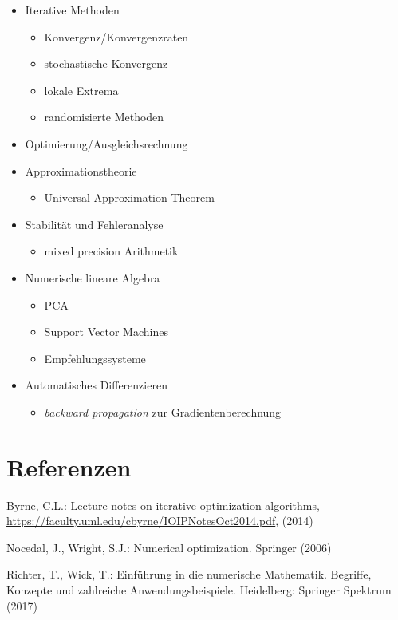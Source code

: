 \documentclass[
]{book}
\providecommand{\tightlist}{%
  \setlength{\itemsep}{0pt}\setlength{\parskip}{0pt}}
\newenvironment{cslreferences}%
  {}%
  {\par}
\theoremstyle{definition}
\theoremstyle{definition}
\theoremstyle{definition}
\theoremstyle{definition}
\theoremstyle{remark}
\begin{document}
\begin{itemize}
\item
  Iterative Methoden

  \begin{itemize}
  \tightlist
  \item
    Konvergenz/Konvergenzraten
  \item
    stochastische Konvergenz
  \item
    lokale Extrema
  \item
    randomisierte Methoden
  \end{itemize}
\item
  Optimierung/Ausgleichsrechnung
\item
  Approximationstheorie

  \begin{itemize}
  \tightlist
  \item
    Universal Approximation Theorem
  \end{itemize}
\item
  Stabilität und Fehleranalyse

  \begin{itemize}
  \tightlist
  \item
    mixed precision Arithmetik
  \end{itemize}
\item
  Numerische lineare Algebra

  \begin{itemize}
  \tightlist
  \item
    PCA
  \item
    Support Vector Machines
  \item
    Empfehlungssysteme
  \end{itemize}
\item
  Automatisches Differenzieren

  \begin{itemize}
  \tightlist
  \item
    \emph{backward propagation} zur Gradientenberechnung
  \end{itemize}
\end{itemize}

\hypertarget{referenzen}{%
\chapter*{Referenzen}\label{referenzen}}

\hypertarget{refs}{}
\begin{cslreferences}
\leavevmode\hypertarget{ref-Byr14}{}%
Byrne, C.L.: Lecture notes on iterative optimization algorithms, \url{https://faculty.uml.edu/cbyrne/IOIPNotesOct2014.pdf}, (2014)

\leavevmode\hypertarget{ref-NocW06}{}%
Nocedal, J., Wright, S.J.: Numerical optimization. Springer (2006)

\leavevmode\hypertarget{ref-RicW17}{}%
Richter, T., Wick, T.: Einführung in die numerische Mathematik. Begriffe, Konzepte und zahlreiche Anwendungsbeispiele. Heidelberg: Springer Spektrum (2017)
\end{cslreferences}
\end{document}
